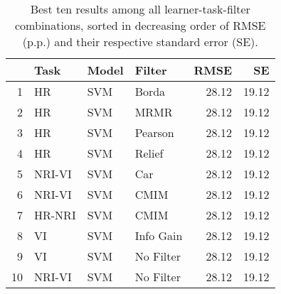 \begin{table}[ht!]
\centering
\caption{Best ten results among all learner-task-filter combinations, sorted in decreasing order of RMSE (p.p.) and their respective standard error (SE).} 
\label{tab:perf-top-10}
\begin{tabular}{rlllrr}
  \hline
 & Task & Model & Filter & RMSE & SE \\ 
  \hline
1 & HR & SVM & Borda & 28.12 & 19.12 \\ 
  2 & HR & SVM & MRMR & 28.12 & 19.12 \\ 
  3 & HR & SVM & Pearson & 28.12 & 19.12 \\ 
  4 & HR & SVM & Relief & 28.12 & 19.12 \\ 
  5 & NRI-VI & SVM & Car & 28.12 & 19.12 \\ 
  6 & NRI-VI & SVM & CMIM & 28.12 & 19.12 \\ 
  7 & HR-NRI & SVM & CMIM & 28.12 & 19.12 \\ 
  8 & VI & SVM & Info Gain & 28.12 & 19.12 \\ 
  9 & VI & SVM & No Filter & 28.12 & 19.12 \\ 
  10 & NRI-VI & SVM & No Filter & 28.12 & 19.12 \\ 
   \hline
\end{tabular}
\end{table}
